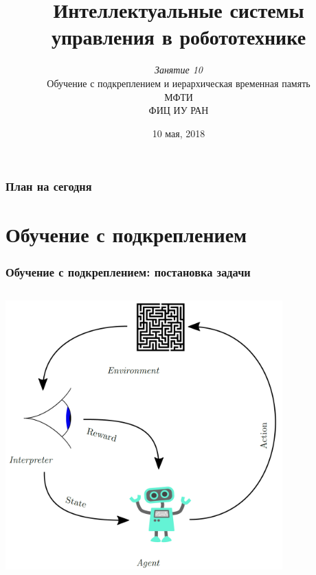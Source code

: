\documentclass[12pt]{beamer}
\title{\small{Интеллектуальные системы управления в робототехнике}}
\author{\small{%
\emph{Занятие 10} \\ Обучение с подкреплением и иерархическая временная память\\}%
\vspace{30pt}%
МФТИ\\
ФИЦ ИУ РАН%
\vspace{20pt}%
}
\date{\small{10 мая, 2018}}
\begin{document}
\maketitle

\begin{frame}
\frametitle{План на сегодня}
\tableofcontents 
\end{frame}	

	\section{Обучение с подкреплением}

	\begin{frame}
		\frametitle{Обучение с подкреплением: постановка задачи}
		
		\begin{columns}
			\begin{column}{0.6\textwidth}
				\centering
				\includegraphics[width=0.8\textwidth]{rl_simple.png}
				
				\par\bigskip
				

\end{column}
\end{columns}
\end{frame}
\end{document}
